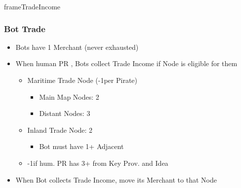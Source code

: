 \documentclass[10pt]{article}
\newlength{\fhActionCards} \setlength\fhActionCards{15\baselineskip}
\newlength{\fhTrade} \setlength\fhTrade{\calc{\textheight - \fhActionCards - \frameToFrameSpacing}}
\begin{document}
\begin{dynamiccontents*}{frameTradeIncome}
\begin{eubox}{\fhTrade}
{	\subsubsection*{Bot Trade }
	\begin{itemize}
		\item Bots have 1 Merchant (never exhausted)
		\item When human PR , Bots collect Trade Income if Node is eligible for them
		\begin{itemize}
			\item Maritime Trade Node (-1\botpower per Pirate)
			\begin{itemize}
				\item Main Map Nodes: 2\botpower
				\item Distant Nodes: 3\botpower
			\end{itemize}
			\item Inland Trade Node: 2\botpower
			\begin{itemize}
				\item Bot must have 1+ Adjacent \town
			\end{itemize}
			\item -1\botpower if hum. PR has 3+ \tradepower from Key Prov. and  Idea
		\end{itemize}
		\item When Bot collects Trade Income, move its Merchant to that Node	
	\end{itemize}
	}
\end{eubox}\end{dynamiccontents*}
\end{document}
